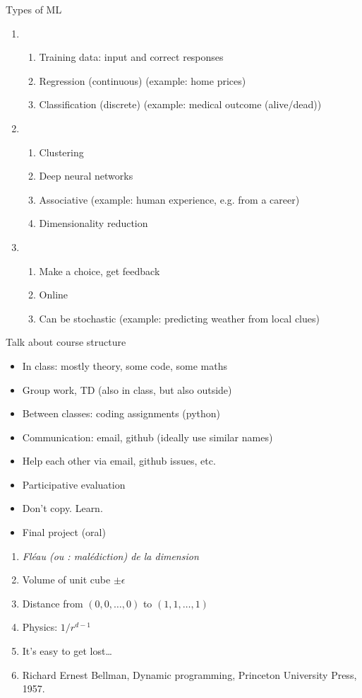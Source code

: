 Types of ML
\begin{enumerate}
\item {}
  \begin{enumerate}
  \item Training data: input and correct responses
  \item Regression (continuous) (example: home prices)
  \item Classification (discrete) (example: medical outcome (alive/dead))
  \end{enumerate}
\item {}
  \begin{enumerate}
  \item Clustering
  \item Deep neural networks
  \item Associative (example: human experience, e.g. from a career)
  \item Dimensionality reduction
  \end{enumerate}
\item {}
  \begin{enumerate}
  \item Make a choice, get feedback
  \item Online
  \item Can be stochastic (example: predicting weather from local clues)
  \end{enumerate}
\end{enumerate}

Talk about course structure
\begin{itemize}
\item In class: mostly theory, some code, some maths
\item Group work, TD (also in class, but also outside)
\item Between classes: coding assignments (python)
\item Communication: email, github (ideally use similar names)
\item Help each other via email, github issues, etc.
\item Participative evaluation
\item Don't copy.  Learn.
\item Final project (oral)
\end{itemize}

\begin{enumerate}
\item \textit{Fléau (ou : malédiction) de la dimension}
\item Volume of unit cube $\pm\epsilon$
\item Distance from $(0,0,\ldots,0)$ to $(1,1,\ldots,1)$
\item Physics: $1/r^{d-1}$
\item It's easy to get lost\dots
\item Richard Ernest Bellman, Dynamic programming, Princeton
  University Press, 1957.
\end{enumerate}


